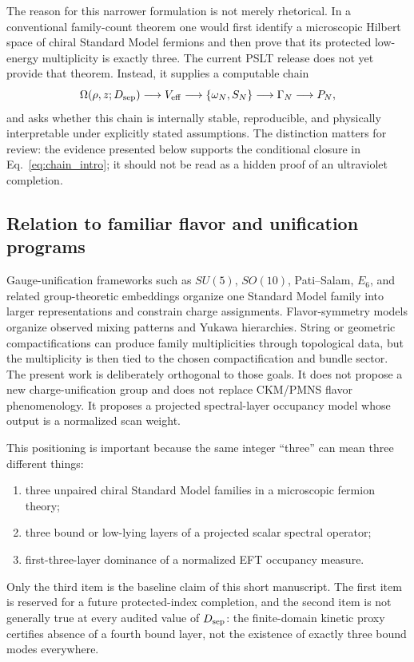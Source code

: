 \documentclass[aps,prd,onecolumn,notitlepage,nofootinbib,superscriptaddress,11pt,floatfix]{revtex4-2}
\newcommand{\Dsep}{D_{\rm sep}}
\begin{document}
The reason for this narrower formulation is not merely rhetorical.
In a conventional family-count theorem one would first identify a microscopic Hilbert space of chiral Standard Model fermions and then prove that its protected low-energy multiplicity is exactly three.
The current PSLT release does not yet provide that theorem.
Instead, it supplies a computable chain
\begin{equation}
    \Omega(\rho,z;\Dsep)
    \longrightarrow
    V_{\rm eff}
    \longrightarrow
    \{\omega_N,S_N\}
    \longrightarrow
    \Gamma_N
    \longrightarrow
    P_N,
    \label{eq:chain_intro}
\end{equation}
and asks whether this chain is internally stable, reproducible, and physically interpretable under explicitly stated assumptions.
The distinction matters for review: the evidence presented below supports the conditional closure in Eq.~\eqref{eq:chain_intro}; it should not be read as a hidden proof of an ultraviolet completion.

\subsection{Relation to familiar flavor and unification programs}

Gauge-unification frameworks such as \(SU(5)\), \(SO(10)\), Pati--Salam, \(E_6\), and related group-theoretic embeddings organize one Standard Model family into larger representations and constrain charge assignments.
Flavor-symmetry models organize observed mixing patterns and Yukawa hierarchies.
String or geometric compactifications can produce family multiplicities through topological data, but the multiplicity is then tied to the chosen compactification and bundle sector.
The present work is deliberately orthogonal to those goals.
It does not propose a new charge-unification group and does not replace CKM/PMNS flavor phenomenology.
It proposes a projected spectral-layer occupancy model whose output is a normalized scan weight.

This positioning is important because the same integer ``three'' can mean three different things:
\begin{enumerate}
    \item three unpaired chiral Standard Model families in a microscopic fermion theory;
    \item three bound or low-lying layers of a projected scalar spectral operator;
    \item first-three-layer dominance of a normalized EFT occupancy measure.
\end{enumerate}
Only the third item is the baseline claim of this short manuscript.
The first item is reserved for a future protected-index completion, and the second item is not generally true at every audited value of \(\Dsep\): the finite-domain kinetic proxy certifies absence of a fourth bound layer, not the existence of exactly three bound modes everywhere.
\end{document}
